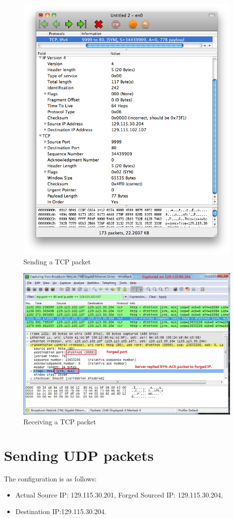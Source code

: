 \documentclass[12pt,letterpaper]{report}
\begin{document}
\begin{figure}[!htp]
\centering
\includegraphics[width=0.8\linewidth]{tcp1.png}
\caption{Sending a TCP packet}
\label{tcp1}
\end{figure}


\begin{figure}[!htp]
\centering
\includegraphics[width=\linewidth]{tcp2.jpg}
\caption{Receiving a TCP packet}
\label{tcp2}
\end{figure}

\section*{Sending UDP packets}
The configuration is as follows:
\begin{itemize}
 \item Actual Source IP: 129.115.30.201, Forged Sourced 
 IP: 129.115.30.204,
 \item Destination IP:129.115.30.204.
\end{itemize}
\end{document}
